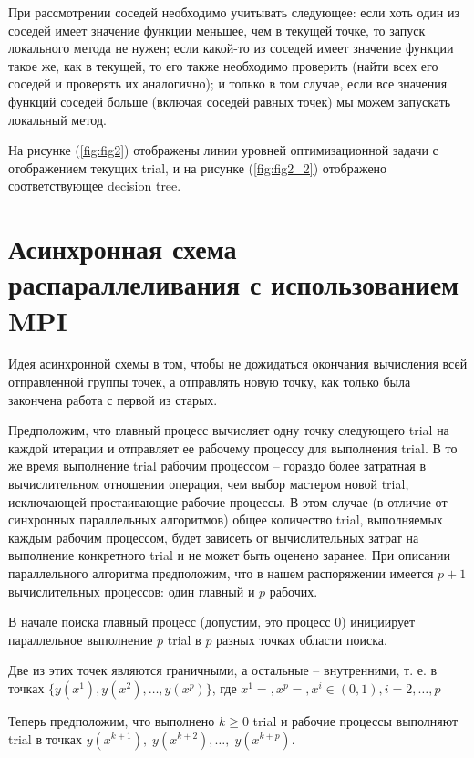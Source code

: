 \documentclass{svproc}
\begin{document}
При рассмотрении соседей необходимо учитывать следующее: если хоть один из соседей имеет значение функции меньшее, чем в текущей точке, то запуск локального метода не нужен; если какой-то из соседей имеет значение функции такое же, как в текущей, то его также необходимо проверить (найти всех его соседей и проверять их аналогично); и только в том случае, если все значения функций соседей больше (включая соседей равных точек) мы можем запускать локальный метод.

На рисунке  (\ref{fig:fig2}) отображены линии уровней оптимизационной задачи с отображением текущих  trial, и на рисунке  (\ref{fig:fig2_2}) отображено соответствующее decision tree. 

\section{Асинхронная схема распараллеливания с использованием MPI }

Идея асинхронной схемы в том, чтобы не дожидаться окончания вычисления всей отправленной группы точек, а отправлять новую точку, как только была закончена работа с первой из старых. 

Предположим, что главный процесс вычисляет одну точку следующего trial на каждой итерации и отправляет ее рабочему процессу для выполнения trial. В то же время выполнение trial рабочим процессом – гораздо более затратная в вычислительном отношении операция, чем выбор мастером новой trial, исключающей простаивающие рабочие процессы. В этом случае (в отличие от синхронных параллельных алгоритмов) общее количество trial, выполняемых каждым рабочим процессом, будет зависеть от вычислительных затрат на выполнение конкретного trial и не может быть оценено заранее. При описании параллельного алгоритма предположим, что в нашем распоряжении имеется $p+1$ вычислительных процессов: один главный и $p$ рабочих.

 В начале поиска главный процесс (допустим, это процесс $0$) инициирует параллельное выполнение $p$ trial в $p$ разных точках области поиска.

Две из этих точек являются граничными, а остальные – внутренними, т. е. в точках $\{y\left(x^1\right),y\left(x^2\right),\ldots,y\left(x^p\right)\}$, где
$x^1=,x^p=,x^i\in\left(0,1\right),i=2,\ldots,p$

Теперь предположим, что выполнено $k\geq0$ trial и рабочие процессы выполняют trial в точках $y\left(x^{k+1}\right),\;y\left(x^{k+2}\right),\ldots,\;y\left(x^{k+p}\right)$.
\end{document}
